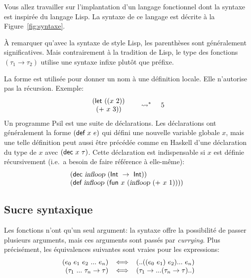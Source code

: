 \documentclass{article}
\begin{document}
Vous allez travailler sur l'implantation d'un langage fonctionnel dont la
syntaxe est inspirée du langage Lisp.  La syntaxe de ce langage est décrite
à la Figure~\ref{fig:syntaxe}.

À remarquer qu'avec la syntaxe de style Lisp, les parenthèses sont
généralement significatives.  Mais contrairement à la tradition de Lisp, le
type des fonctions $(\tau_1 \to \tau_2)$ utilise une syntaxe infixe plutôt
que préfixe.

La forme  est utilisée pour donner un nom à une définition
locale.  Elle n'autorise pas la récursion.  Exemple:
\begin{displaymath}
  \MAlign[c]{(\kw{let}~(\MAlign{(x~2))} \\\;\; (+~x~3))} \;\;\;\;\leadsto^*\;\;\;\;5
\end{displaymath}
Un programme Psil est une suite de déclarations.  Les déclarations ont
généralement la forme $(\textsf{def}~x~e)$ qui défini une nouvelle variable
globale $x$, mais une telle définition peut aussi être précédée comme en
Haskell d'une déclaration du type de $x$ avec $(\textsf{dec}~x~\tau)$.
Cette déclaration est indispensable si $x$ est définie récursivement (i.e.~a
besoin de faire référence à elle-même):
\begin{displaymath}
  \MAlign{
    (\kw{dec}~\id{infloop}~(\kw{Int}~\to~\kw{Int})) \\
    (\kw{def}~\id{infloop}~(\kw{fun}~x~(\id{infloop}~(+~x~1))))
  }
\end{displaymath}


\subsection{Sucre syntaxique}
\label{sec:sucre}

Les fonctions n'ont qu'un seul argument: la syntaxe offre la possibilité de
passer plusieurs arguments, mais ces arguments sont passés par
\emph{currying}.  Plus précisément, les équivalences suivantes sont vraies
pour les expressions:
\begin{displaymath}
  \begin{array}{r@{\;\;\;\;\Longleftrightarrow\;\;\;\;}l}
    (e_0~e_1~e_2~...~e_n) & (..((e_0~e_1)~e_2)...~e_n) \\
    (\tau_1~...~\tau_n \to \tau) & (\tau_1\to ... (\tau_n\to\tau)..)
  \end{array}
\end{displaymath}
\end{document}
